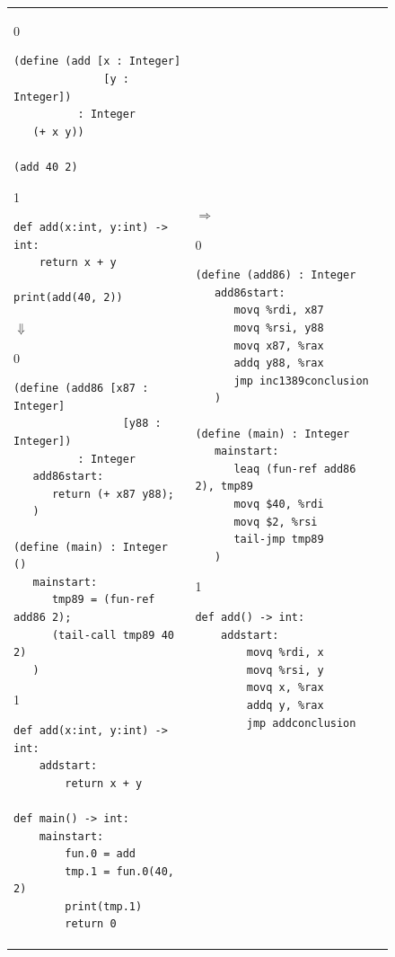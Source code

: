 \documentclass[7x10]{TimesAPriori_MIT}%
\def\racketEd{0}
\def\pythonEd{1}
\def\edition{0}
\numberwithin{theorem}{chapter}
\numberwithin{definition}{chapter}
\numberwithin{equation}{chapter}
\begin{document}
\begin{figure}[htbp]
  \begin{tcolorbox}[colback=white]
    \begin{tabular}{ll}
\begin{minipage}{0.4\textwidth}
{\if\edition\racketEd
\begin{lstlisting}[basicstyle=\ttfamily\footnotesize]
(define (add [x : Integer]
              [y : Integer])
          : Integer
   (+ x y))

(add 40 2)
\end{lstlisting}
\fi}
{\if\edition\pythonEd
\begin{lstlisting}[basicstyle=\ttfamily\footnotesize]
def add(x:int, y:int) -> int:
    return x + y

print(add(40, 2))
\end{lstlisting}
\fi}
$\Downarrow$
{\if\edition\racketEd
\begin{lstlisting}[basicstyle=\ttfamily\footnotesize]
(define (add86 [x87 : Integer]
                 [y88 : Integer])
          : Integer
   add86start:
      return (+ x87 y88);
   )

(define (main) : Integer ()
   mainstart:
      tmp89 = (fun-ref add86 2);
      (tail-call tmp89 40 2)
   )
\end{lstlisting}
\fi}
{\if\edition\pythonEd
\begin{lstlisting}[basicstyle=\ttfamily\footnotesize]
def add(x:int, y:int) -> int:
    addstart:
        return x + y

def main() -> int:
    mainstart:
        fun.0 = add
        tmp.1 = fun.0(40, 2)
        print(tmp.1)
        return 0
\end{lstlisting}
\fi}
\end{minipage}
&
$\Rightarrow$
\begin{minipage}{0.5\textwidth}
{\if\edition\racketEd
\begin{lstlisting}[basicstyle=\ttfamily\footnotesize]
(define (add86) : Integer
   add86start:
      movq %rdi, x87
      movq %rsi, y88
      movq x87, %rax
      addq y88, %rax
      jmp inc1389conclusion
   )

(define (main) : Integer
   mainstart:
      leaq (fun-ref add86 2), tmp89
      movq $40, %rdi
      movq $2, %rsi
      tail-jmp tmp89
   )
\end{lstlisting}
\fi}
{\if\edition\pythonEd
\begin{lstlisting}[basicstyle=\ttfamily\footnotesize]
def add() -> int:
    addstart:
        movq %rdi, x
        movq %rsi, y
        movq x, %rax
        addq y, %rax
        jmp addconclusion


\end{lstlisting}}
\end{minipage}
\end{tabular}
\end{tcolorbox}
\end{figure}
\end{document}
